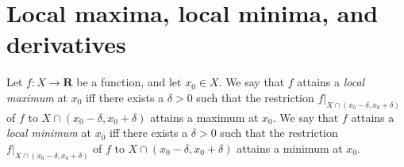 \section{Local maxima, local minima, and derivatives}\label{sec 10.2}

\begin{definition}\label{10.2.1}
    Let \(f : X \to \mathbf{R}\) be a function, and let \(x_0 \in X\).
    We say that \(f\) attains a \emph{local maximum} at \(x_0\) iff there exists a \(\delta > 0\) such that the restriction \(f|_{X \cap (x_0 - \delta, x_0 + \delta)}\) of \(f\) to \(X \cap (x_0 - \delta, x_0 + \delta)\) attains a maximum at \(x_0\).
    We say that \(f\) attains a \emph{local minimum} at \(x_0\) iff there exists a \(\delta > 0\) such that the restriction \(f|_{X \cap (x_0 - \delta, x_0 + \delta)}\) of \(f\) to \(X \cap (x_0 - \delta, x_0 + \delta)\) attains a minimum at \(x_0\).
\end{definition}